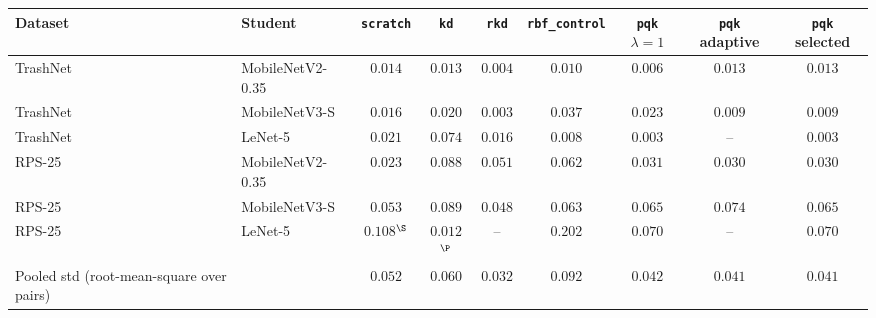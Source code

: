 \begin{tabular}{@{}llccccccc@{}}
\toprule
Dataset & Student & \texttt{scratch} & \texttt{kd} & \texttt{rkd} & \texttt{rbf\_control} & \texttt{pqk} $\lambda{=}1$ & \texttt{pqk} adaptive & \texttt{pqk} selected \\
\midrule
TrashNet & MobileNetV2-0.35 & $0.014$ & $0.013$ & $\mathbf{0.004}$ & $0.010$ & $0.006$ & $0.013$ & $0.013$ \\
TrashNet & MobileNetV3-S & $0.016$ & $0.020$ & $\mathbf{0.003}$ & $0.037$ & $0.023$ & $0.009$ & $0.009$ \\
TrashNet & LeNet-5 & $0.021$ & $0.074$ & $0.016$ & $0.008$ & $0.003$ & -- & $\mathbf{0.003}$ \\
RPS-25 & MobileNetV2-0.35 & $\mathbf{0.023}$ & $0.088$ & $0.051$ & $0.062$ & $0.031$ & $0.030$ & $0.030$ \\
RPS-25 & MobileNetV3-S & $0.053$ & $0.089$ & $\mathbf{0.048}$ & $0.063$ & $0.065$ & $0.074$ & $0.065$ \\
RPS-25 & LeNet-5 & $0.108$$^{\S}$ & $\mathbf{0.012}$$^{\P}$ & -- & $0.202$ & $0.070$ & -- & $0.070$ \\
\midrule
Pooled std (root-mean-square over pairs) & & $0.052$ & $0.060$ & $0.032$ & $0.092$ & $0.042$ & $0.041$ & $0.041$ \\
\bottomrule
\end{tabular}
